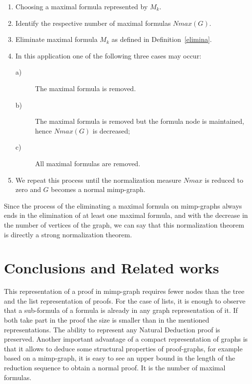 \documentclass[submission,copyright,creativecommons]{eptcs}
\begin{document}
\begin{enumerate}
\item  Choosing a maximal formula represented by $M_k$.

\item  Identify the respective number of maximal formulas $Nmax(G)$.

\item  Eliminate maximal formula $M_k$ as defined in Definition~\ref{elimina}.

\item  In this application one of the following three cases may occur:

\begin{description}
\item[a)]  The maximal formula is removed.
\item[b)]  The maximal formula is removed but the formula node is
maintained,  hence $Nmax(G)$ is decreased;
\item[c)]  All maximal formulas are removed.
\end{description}

\item  We repeat this process until the normalization measure $Nmax$ is
reduced  to zero and $G$ becomes a normal mimp-graph.
\end{enumerate}

Since the process of the eliminating a maximal formula on mimp-graphs always
ends in the elimination of at least one maximal formula, 
and with the decrease in the number of vertices of the graph, we can say that 
this normalization theorem is directly a strong normalization theorem. 

\section{Conclusions and Related works}

This representation of a proof in mimp-graph requires fewer nodes than the 
tree and the list representation of proofs. For the case of lists, it is enough to 
observe that a sub-formula of a formula is already in any graph representation of it. 
If both take part in the proof the size is smaller than in the mentioned 
representations. The ability to represent any Natural Deduction proof is preserved.
Another important advantage of a compact representation of graphs is that it 
allows to deduce some structural properties of proof-graphs, for example based on 
a mimp-graph, it is easy to see an upper bound in the length of the reduction sequence 
to obtain a normal proof. It is the number of maximal formulas.
\end{document}
